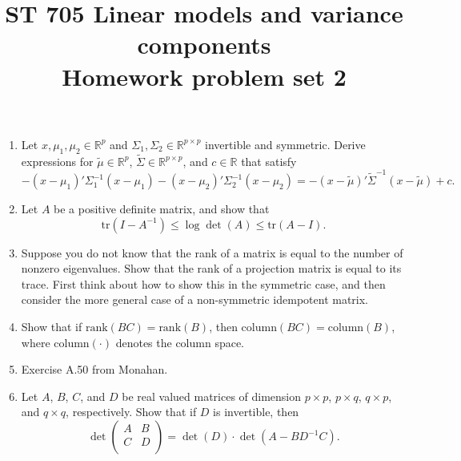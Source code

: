 \documentclass[11pt]{article}
\title{ST 705 Linear models and variance components \\ 
        Homework problem set 2}
\begin{document}
\maketitle

\begin{enumerate}

\item Let $x, \mu_{1}, \mu_{2} \in \mathbb{R}^{p}$ and $\Sigma_{1}, \Sigma_{2} \in \mathbb{R}^{p\times p}$ invertible and symmetric.  Derive expressions for $\widetilde{\mu} \in \mathbb{R}^{p}$, $\widetilde{\Sigma} \in \mathbb{R}^{p\times p}$, and $c \in \mathbb{R}$ that satisfy
\[
-(x - \mu_{1})'\Sigma_{1}^{-1}(x - \mu_{1}) - (x - \mu_{2})'\Sigma_{2}^{-1}(x - \mu_{2}) = -(x - \widetilde{\mu})'\widetilde{\Sigma}^{-1}(x - \widetilde{\mu}) + c.
\]

\item Let $A$ be a positive definite matrix, and show that 
\[
\text{tr}(I - A^{-1}) \le \log\det(A) \le \text{tr}(A - I).
\]

\item Suppose you do not know that the rank of a matrix is equal to the number of nonzero eigenvalues.  Show that the rank of a projection matrix is equal to its trace.  First think about how to show this in the symmetric case, and then consider the more general case of a non-symmetric idempotent matrix.

\item Show that if $\text{rank}(BC) = \text{rank}(B)$, then $\text{column}(BC) = \text{column}(B)$, where column$(\cdot)$ denotes the column space.

\item Exercise A.50 from Monahan.

\item Let $A$, $B$, $C$, and $D$ be real valued matrices of dimension $p\times p$, $p\times q$, $q\times p$, and $q\times q$, respectively.  Show that if $D$ is invertible, then
\[
\det
\begin{pmatrix}
A & B \\
C & D \\
\end{pmatrix} = \det(D) \cdot \det(A - BD^{-1}C).
\]


\end{enumerate}
\end{document}
